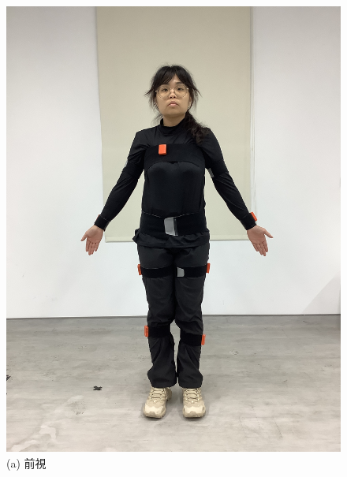 \begin{figure}[!ht]
   \centering
   \begin{minipage}{.25\textwidth}
     \centering
     \includegraphics[width=\linewidth, angle=-90]{figure/ch3_fig_frontimu.JPG}
     \caption*{(a) 前視}
   \end{minipage}%
   \begin{minipage}{.25\textwidth}
      \centering

\end{minipage}
\end{figure}
